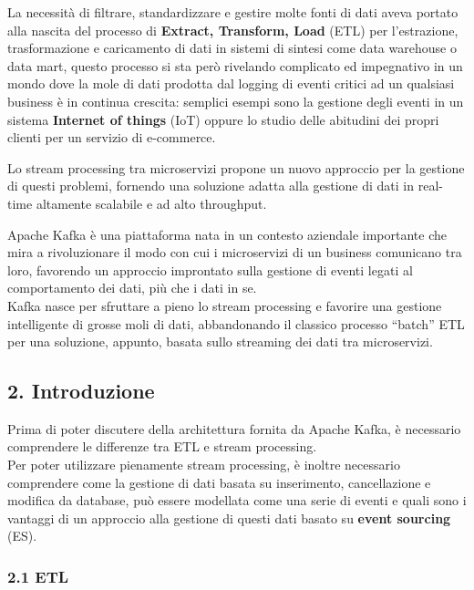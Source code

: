 \documentclass[]{article}
\begin{document}
La necessità di filtrare, standardizzare e gestire molte fonti di dati
aveva portato alla nascita del processo di \textbf{Extract, Transform,
Load} (ETL) per l'estrazione, trasformazione e caricamento di dati in
sistemi di sintesi come data warehouse o data mart, questo processo si
sta però rivelando complicato ed impegnativo in un mondo dove la mole di
dati prodotta dal logging di eventi critici ad un qualsiasi business è
in continua crescita: semplici esempi sono la gestione degli eventi in
un sistema \textbf{Internet of things} (IoT) oppure lo studio delle
abitudini dei propri clienti per un servizio di e-commerce.

Lo stream processing tra microservizi propone un nuovo approccio per la
gestione di questi problemi, fornendo una soluzione adatta alla gestione
di dati in real-time altamente scalabile e ad alto throughput.

Apache Kafka è una piattaforma nata in un contesto aziendale importante
che mira a rivoluzionare il modo con cui i microservizi di un business
comunicano tra loro, favorendo un approccio improntato sulla gestione di
eventi legati al comportamento dei dati, più che i dati in se.\\
Kafka nasce per sfruttare a pieno lo stream processing e favorire una
gestione intelligente di grosse moli di dati, abbandonando il classico
processo ``batch'' ETL per una soluzione, appunto, basata sullo
streaming dei dati tra microservizi.

\newpage

\hypertarget{introduzione}{\subsection{2.
Introduzione}\label{introduzione}}

Prima di poter discutere della architettura fornita da Apache Kafka, è
necessario comprendere le differenze tra ETL e stream processing.\\
Per poter utilizzare pienamente stream processing, è inoltre necessario
comprendere come la gestione di dati basata su inserimento,
cancellazione e modifica da database, può essere modellata come una
serie di eventi e quali sono i vantaggi di un approccio alla gestione di
questi dati basato su \textbf{event sourcing} (ES).

\hypertarget{etl}{\subsubsection{2.1 ETL}\label{etl}}
\end{document}
